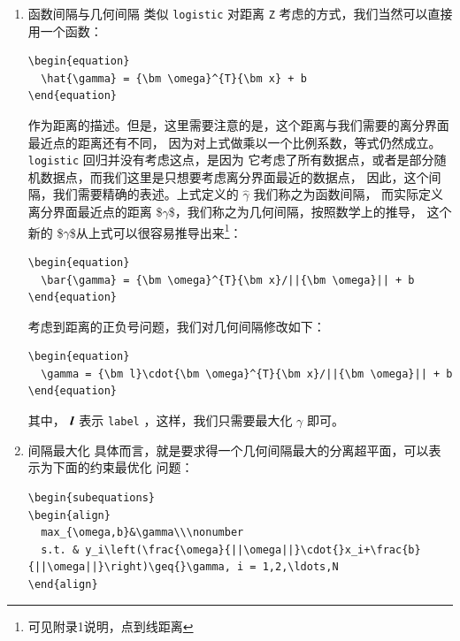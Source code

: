 \documentclass[11pt]{ctexart}
\newcommand{\bm}[1]{\mbox{\boldmath{$#1$}}}
\begin{document}
\begin{enumerate}
\item 函数间隔与几何间隔
\label{sec:orgheadline68}
类似 \texttt{logistic} 对距离 \texttt{Z} 考虑的方式，我们当然可以直接用一个函数：
\lstset{language=[LaTeX]TeX,label= ,caption= ,captionpos=b,numbers=none}
\begin{lstlisting}
\begin{equation}
  \hat{\gamma} = {\bm \omega}^{T}{\bm x} + b
\end{equation}
\end{lstlisting}
作为距离的描述。但是，这里需要注意的是，这个距离与我们需要的离分界面最近点的距离还有不同，
因为对上式做乘以一个比例系数，等式仍然成立。 \texttt{logistic} 回归并没有考虑这点，是因为
它考虑了所有数据点，或者是部分随机数据点，而我们这里是只想要考虑离分界面最近的数据点，
因此，这个间隔，我们需要精确的表述。上式定义的 \(\hat{\gamma}\) 我们称之为函数间隔，
而实际定义离分界面最近点的距离 \$\(\gamma\)\$，我们称之为几何间隔，按照数学上的推导，
这个新的 \$\(\gamma\)\$从上式可以很容易推导出来\footnote{可见附录1说明，点到线距离}：
\lstset{language=[LaTeX]TeX,label= ,caption= ,captionpos=b,numbers=none}
\begin{lstlisting}
\begin{equation}
  \bar{\gamma} = {\bm \omega}^{T}{\bm x}/||{\bm \omega}|| + b
\end{equation}
\end{lstlisting}
考虑到距离的正负号问题，我们对几何间隔修改如下：
\lstset{language=[LaTeX]TeX,label= ,caption= ,captionpos=b,numbers=none}
\begin{lstlisting}
\begin{equation}
  \gamma = {\bm l}\cdot{\bm \omega}^{T}{\bm x}/||{\bm \omega}|| + b
\end{equation}
\end{lstlisting}
其中， \({\bm l}\) 表示 \texttt{label} ，这样，我们只需要最大化 \(\gamma\) 即可。
\item 间隔最大化
\label{sec:orgheadline69}
具体而言，就是要求得一个几何间隔最大的分离超平面，可以表示为下面的约束最优化
问题：
\lstset{language=[LaTeX]TeX,label= ,caption= ,captionpos=b,numbers=none}
\begin{lstlisting}
\begin{subequations}
\begin{align}
  max_{\omega,b}&\gamma\\\nonumber
  s.t. & y_i\left(\frac{\omega}{||\omega||}\cdot{}x_i+\frac{b}{||\omega||}\right)\geq{}\gamma, i = 1,2,\ldots,N
\end{align}

\end{lstlisting}
\end{enumerate}
\end{document}
